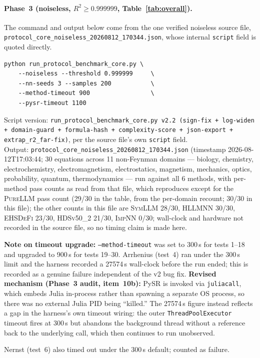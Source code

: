 \documentclass[twoside,11pt]{article}
\newcommand{\PureLLM}{\textsc{PureLLM}}
\newcommand{\INN}{\textsc{ImpNN}}
\newcommand{\EHD}{\textsc{EHSDeFi}}
\newcommand{\HSL}{\textsc{HLLMNN}}
\newcommand{\SEL}{\textsc{SymLLM}}
\newcommand{\HDS}{\textsc{HDSv50\_2}}
\begin{document}
\paragraph{Phase~3 (noiseless, $R^2\geq0.999999$, Table~\ref{tab:overall}).}
The command and output below come from the one verified noiseless source file, \texttt{protocol\_core\_noiseless\_20260812\_170344.json}, whose internal \texttt{script} field is quoted directly.
\begin{verbatim}
python run_protocol_benchmark_core.py \
    --noiseless --threshold 0.999999     \
    --nn-seeds 3 --samples 200           \
    --method-timeout 900                 \
    --pysr-timeout 1100
\end{verbatim}
Script version: \texttt{run\_protocol\_benchmark\_core.py v2.2 (sign-fix +
log-widen + domain-guard + formula-hash + complexity-score + json-export +
extrap\_r2\_far-fix)}, per the source file's own \texttt{script} field.\\
Output: \texttt{protocol\_core\_noiseless\_20260812\_170344.json}
(timestamp 2026-08-12T17:03:44; 30 equations across 11 non-Feynman domains
--- biology, chemistry, electrochemistry, electromagnetism, electrostatics,
magnetism, mechanics, optics, probability, quantum, thermodynamics --- run
against all 6 methods, with per-method pass counts as read from that file, which
\Cref{tab:overall} reproduces except for the \PureLLM{} pass count (29/30 in the table, from the per-domain recount; 30/30 in this file); the other counts in this file are \SEL{} 28/30, \HSL{} 30/30, \EHD{} 23/30, \HDS{} 21/30, \INN{} 0/30; wall-clock and hardware not recorded in
the source file, so no timing claim is made here.

\textbf{Note on timeout upgrade:} \texttt{--method-timeout} was set to 300\,s
for tests 1--18 and upgraded to 900\,s for tests 19--30. Arrhenius (test~4)
ran under the 300\,s limit and the harness recorded a 27574\,s wall-clock
before the run ended; this is recorded as a genuine failure independent of
the v2 bug fix. \textbf{Revised mechanism (Phase~3 audit, item~10b):} PySR is
invoked via \texttt{juliacall}, which embeds Julia in-process rather than
spawning a separate OS process, so there was no external Julia PID being
``killed.'' The 27574\,s figure instead reflects a gap in the harness's own
timeout wiring: the outer \texttt{ThreadPoolExecutor} timeout fires at
300\,s but abandons the background thread without a reference back to the
underlying call, which then continues to run unobserved.

Nernst (test~6) also timed out under the 300\,s default; counted as failure.
\end{document}
